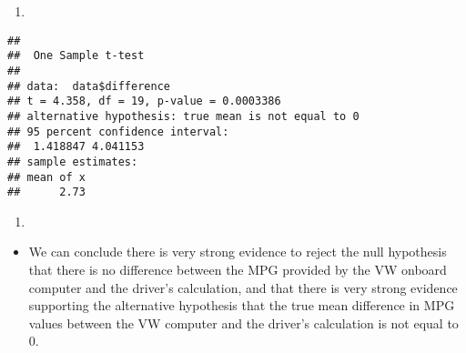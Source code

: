 \documentclass[]{article}
\newenvironment{Shaded}{\begin{snugshade}}{\end{snugshade}}
\newcommand{\KeywordTok}[1]{\textcolor[rgb]{0.13,0.29,0.53}{\textbf{#1}}}
\newcommand{\DataTypeTok}[1]{\textcolor[rgb]{0.13,0.29,0.53}{#1}}
\newcommand{\DecValTok}[1]{\textcolor[rgb]{0.00,0.00,0.81}{#1}}
\newcommand{\OperatorTok}[1]{\textcolor[rgb]{0.81,0.36,0.00}{\textbf{#1}}}
\newcommand{\NormalTok}[1]{#1}
\providecommand{\tightlist}{%
  \setlength{\itemsep}{0pt}\setlength{\parskip}{0pt}}
\begin{document}
\begin{enumerate}
\def\labelenumi{(\alph{enumi})}
\setcounter{enumi}{3}
\item
\end{enumerate}

\begin{Shaded}
\end{Shaded}

\begin{verbatim}
## 
##  One Sample t-test
## 
## data:  data$difference
## t = 4.358, df = 19, p-value = 0.0003386
## alternative hypothesis: true mean is not equal to 0
## 95 percent confidence interval:
##  1.418847 4.041153
## sample estimates:
## mean of x 
##      2.73
\end{verbatim}

\begin{enumerate}
\def\labelenumi{(\alph{enumi})}
\setcounter{enumi}{4}
\item
\end{enumerate}

\begin{itemize}
\tightlist
\item
  We can conclude there is very strong evidence to reject the null
  hypothesis that there is no difference between the MPG provided by the
  VW onboard computer and the driver's calculation, and that there is
  very strong evidence supporting the alternative hypothesis that the
  true mean difference in MPG values between the VW computer and the
  driver's calculation is not equal to 0.
\end{itemize}
\end{document}
